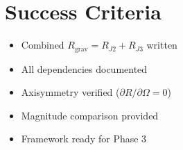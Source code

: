 \documentclass[11pt]{article}
\begin{document}
\section{Success Criteria}
\begin{itemize}
    \item[$\checkmark$] Combined $R_{\text{grav}} = R_{J2} + R_{J3}$ written
    \item[$\checkmark$] All dependencies documented
    \item[$\checkmark$] Axisymmetry verified ($\partial R/\partial \Omega = 0$)
    \item[$\checkmark$] Magnitude comparison provided
    \item[$\checkmark$] Framework ready for Phase 3
\end{itemize}
\end{document}

